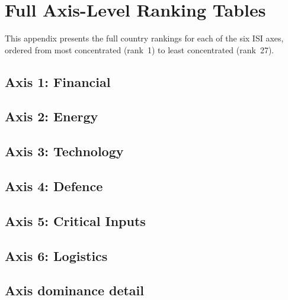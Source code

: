 \section{Full Axis-Level Ranking Tables}\label{app:tables}

This appendix presents the full country rankings for each of the six
ISI axes, ordered from most concentrated (rank~1) to least
concentrated (rank~27).

\subsection{Axis 1: Financial}



\clearpage
\subsection{Axis 2: Energy}



\clearpage
\subsection{Axis 3: Technology}



\clearpage
\subsection{Axis 4: Defence}



\clearpage
\subsection{Axis 5: Critical Inputs}



\clearpage
\subsection{Axis 6: Logistics}



\clearpage
\subsection{Axis dominance detail}

